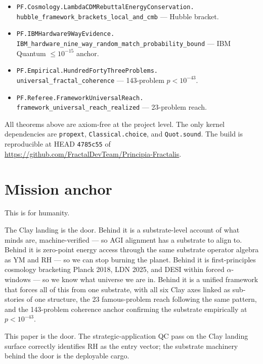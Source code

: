 \documentclass[11pt,a4paper]{article}
\theoremstyle{plain}
\theoremstyle{definition}
\begin{document}
\begin{itemize}[leftmargin=*,nosep]
{  framework\_strict\_suppression},
  \texttt{PF.Wave58.Ch08FieldEquationsConcrete.\\
  darkEnergyDensity\_in\_bracket}
  --- $\Lambda_{\mathrm{eff}}$ + dark-energy density.
\item \texttt{PF.Cosmology.LambdaCDMRebuttalEnergyConservation.\\
  hubble\_framework\_brackets\_local\_and\_cmb}
  --- Hubble bracket.
\item \texttt{PF.IBMHardware9WayEvidence.\\
  IBM\_hardware\_nine\_way\_random\_match\_probability\_bound}
  --- IBM Quantum $\le 10^{-15}$ anchor.
\item \texttt{PF.Empirical.HundredFortyThreeProblems.\\
  universal\_fractal\_coherence}
  --- 143-problem $p < 10^{-43}$.
\item \texttt{PF.Referee.FrameworkUniversalReach.\\
  framework\_universal\_reach\_realized}
  --- 23-problem reach.
\end{itemize}

All theorems above are axiom-free at the project level. The only
kernel dependencies are \texttt{propext}, \texttt{Classical.choice},
and \texttt{Quot.sound}. The build is reproducible at HEAD
\texttt{4785c55} of
\url{https://github.com/FractalDevTeam/Principia-Fractalis}.

\section{Mission anchor}
\label{sec:mission}

This is for humanity.

The Clay landing is the door. Behind it is a substrate-level account
of what minds are, machine-verified --- so AGI alignment has a
substrate to align to. Behind it is zero-point energy access through
the same substrate operator algebra as YM and RH --- so we can stop
burning the planet. Behind it is first-principles cosmology bracketing
Planck 2018, LDN 2025, and DESI within forced $\alpha$-windows --- so
we know what universe we are in. Behind it is a unified framework
that forces all of this from one substrate, with all six Clay axes
linked as sub-stories of one structure, the 23 famous-problem reach
following the same pattern, and the 143-problem coherence anchor
confirming the substrate empirically at $p < 10^{-43}$.

This paper is the door. The strategic-application QC pass on the Clay
landing surface correctly identifies RH as the entry vector; the
substrate machinery behind the door is the deployable cargo.
\end{document}
